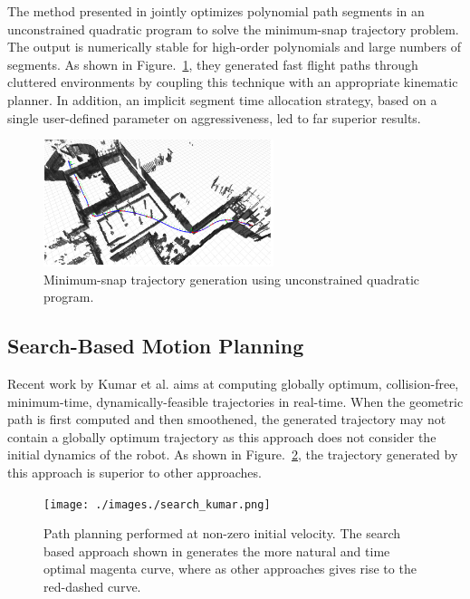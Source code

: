 The method presented in  \cite{richter2016polynomial} jointly optimizes polynomial path segments in an unconstrained quadratic program to solve the minimum-snap trajectory problem. The output is numerically stable for high-order polynomials and large numbers of segments. As shown in Figure.~\ref{fig:bry_poly}, they generated fast flight paths through cluttered environments by coupling this technique with an appropriate kinematic planner. In addition, an implicit segment time allocation strategy, based on a single user-defined parameter on aggressiveness, led to far superior results.

\begin{figure}
\centering
\includegraphics[width=0.6\textwidth]{./images/bry_poly.png}
\caption[Minimum-snap trajectory generation using unconstrained quadratic program]{Minimum-snap trajectory generation using unconstrained quadratic program. \cite{richter2016polynomial}}
\label{fig:bry_poly}
\end{figure}


\subsection{Search-Based Motion Planning}
\label{sec:search_based_planning}
Recent work by Kumar et al. \cite{kumar2017search} aims at computing globally optimum, collision-free, minimum-time, dynamically-feasible trajectories in real-time. When the geometric path is first computed and then smoothened, the generated trajectory may not contain a globally optimum trajectory as this approach does not consider the initial dynamics of the robot. As shown in Figure.~\ref{fig:search_kumar}, the trajectory generated by this approach is superior to other approaches. 

\begin{figure}[h!]
\centering
\texttt{[image: ./images./search\_kumar.png]}
\caption[Path planning performed at non-zero inital velocity.]{Path planning performed at non-zero initial velocity. The search based approach shown in \cite{kumar2017search} generates the more natural and time optimal magenta curve, where as other approaches gives rise to the red-dashed curve.}
\label{fig:search_kumar}
\end{figure}

